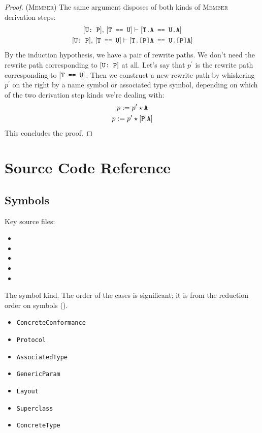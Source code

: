 \documentclass[../generics]{subfiles}
\begin{document}
\begin{proof}
(\textsc{Member}) The same argument disposes of both kinds of \textsc{Member} derivation steps:
\begin{gather*}
\ConfReq{U}{P},\,\SameReq{T}{U}\vdash\SameReq{T.A}{U.A}\\
\ConfReq{U}{P},\,\SameReq{T}{U}\vdash\SameReq{T.[P]A}{U.[P]A}
\end{gather*}
By the induction hypothesis, we have a pair of rewrite paths. We don't need the rewrite path corresponding to $[\texttt{U:~P}]$ at all. Let's say that $p^\prime$ is the rewrite path corresponding to $[\texttt{T == U}]$. Then we construct a new rewrite path by whiskering $p^\prime$ on the right by a name symbol or associated type symbol, depending on which of the two derivation step kinds we're dealing with:
\begin{gather*}
p := p^\prime \star \texttt{A}\\
p := p^\prime \star [\texttt{P}|\texttt{A}]
\end{gather*}
This concludes the proof.
\end{proof}

\section{Source Code Reference}\label{symbols terms rules sourceref}

\subsection*{Symbols}

Key source files:
\begin{itemize}
\item {}
\item {}
\item {}
\item {}
\item {}
\end{itemize}


The symbol kind. The order of the cases is significant; it is from the reduction order on symbols ().
\begin{itemize}
\item \texttt{ConcreteConformance}
\item \texttt{Protocol}
\item \texttt{AssociatedType}
\item \texttt{GenericParam}
\item \texttt{Layout}
\item \texttt{Superclass}
\item \texttt{ConcreteType}
\end{itemize}
\end{document}
